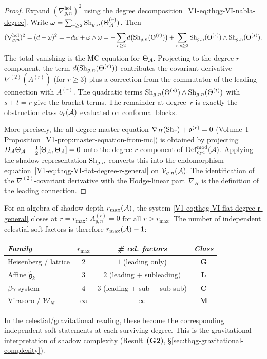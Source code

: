\begin{proof}
Expand $(\nabla^{\mathrm{hol}}_{g,n})^2$ using the
degree decomposition~\eqref{V1-eq:thqg-VI-nabla-degree}. Write
$\omega = \sum_{r \geq 2} \operatorname{Sh}_{g,n}(\Theta^{(r)}_{\mathcal{A}})$.
Then
\[
(\nabla^{\mathrm{hol}}_{g,n})^2
= (d - \omega)^2
= -d\omega + \omega \wedge \omega
= -\sum_{r \geq 2} d\bigl(\operatorname{Sh}_{g,n}(\Theta^{(r)})\bigr)
 + \sum_{r,s \geq 2}
 \operatorname{Sh}_{g,n}(\Theta^{(r)}) \wedge \operatorname{Sh}_{g,n}(\Theta^{(s)}).
\]
The total vanishing is the MC equation for $\Theta_{\mathcal{A}}$.
Projecting to the degree-$r$ component, the term $d(\operatorname{Sh}_{g,n}(\Theta^{(r)}))$
contributes the covariant derivative $\nabla^{(2)}(A^{(r)})$ (for
$r \geq 3$) plus a correction from the commutator of the leading
connection with $A^{(r)}$. The quadratic terms
$\operatorname{Sh}_{g,n}(\Theta^{(s)}) \wedge \operatorname{Sh}_{g,n}(\Theta^{(t)})$ with
$s + t = r$ give the bracket terms. The remainder at degree~$r$
is exactly the obstruction class $o_r(\mathcal{A})$ evaluated on conformal
blocks.

More precisely, the all-degree master equation
$\nabla_H(\operatorname{Sh}_r) + \mathfrak{o}^{(r)} = 0$
(Volume~I Proposition~\ref{V1-prop:master-equation-from-mc}) is obtained by
projecting $D_{\mathcal{A}}\Theta_{\mathcal{A}} + \tfrac{1}{2}[\Theta_{\mathcal{A}},\Theta_{\mathcal{A}}] = 0$
onto the degree-$r$ component of $\operatorname{Def}_{\mathrm{cyc}}^{\mathrm{mod}}(\mathcal{A})$.
Applying the shadow representation $\operatorname{Sh}_{g,n}$ converts this into
the endomorphism equation~\eqref{V1-eq:thqg-VI-flat-degree-r-general}
on $\mathcal{V}_{g,n}(\mathcal{A})$. The identification of the
$\nabla^{(2)}$-covariant derivative with the Hodge-linear
part~$\nabla_H$ is the definition of the leading connection.
\end{proof}

\begin{remark}
For an algebra of shadow depth $r_{\max}(\mathcal{A})$, the system
\eqref{V1-eq:thqg-VI-flat-degree-r-general} closes at $r = r_{\max}$:
$A^{(r)}_{g,n} = 0$ for all $r > r_{\max}$. The number of
independent celestial soft factors is therefore $r_{\max}(\mathcal{A}) - 1$:
\begin{center}
\small
\renewcommand{\arraystretch}{1.15}
\begin{tabular}{lccc}
\toprule
\emph{Family} &
$r_{\max}$ &
\emph{\# cel. factors} &
\emph{Class} \\
\midrule
Heisenberg / lattice &
 $2$ & $1$ (leading only) & $\mathbf{G}$ \\
Affine $\widehat{\mathfrak{g}}_k$ &
 $3$ & $2$ (leading + subleading) & $\mathbf{L}$ \\
$\beta\gamma$ system &
 $4$ & $3$ (leading + sub + sub-sub) & $\mathbf{C}$ \\
Virasoro / $\mathcal{W}_N$ &
 $\infty$ & $\infty$ & $\mathbf{M}$ \\
\bottomrule
\end{tabular}
\end{center}
In the celestial/gravitational reading, these become the
corresponding independent soft statements at each surviving
degree. This is the
gravitational interpretation of shadow complexity
(Result~\textbf{(G2)}, \S\ref{sec:thqg-gravitational-complexity}).
\end{remark}

